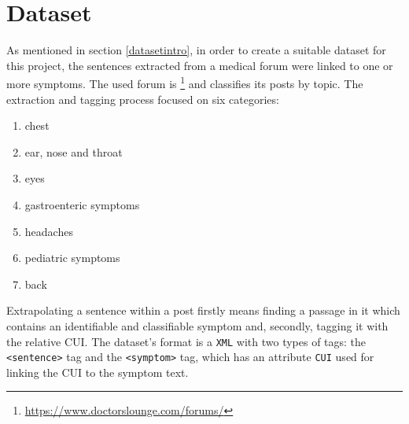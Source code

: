 \newpage
\section{Dataset}
\label{sec:dataset}
As mentioned in section \ref{datasetintro}, in order to create a suitable dataset for this project, the sentences extracted from a medical forum were linked to one or more symptoms. The used forum is \footnote{\url{https://www.doctorslounge.com/forums/}} \cite{doctorslounge} and classifies its posts by topic. The extraction and tagging process focused on six categories:
\begin{enumerate}
  \item chest
  \item ear, nose and throat
  \item eyes
  \item gastroenteric symptoms
  \item headaches
  \item pediatric symptoms
  \item back
\end{enumerate}

Extrapolating a sentence within a post firstly means finding a passage in it which contains an identifiable and classifiable symptom and, secondly, tagging it with the relative CUI. The dataset's format is a \texttt{XML} with two types of tags: the \texttt{<sentence>} tag and the \texttt{<symptom>} tag, which has an attribute \texttt{CUI} used for linking the CUI to the symptom text.
